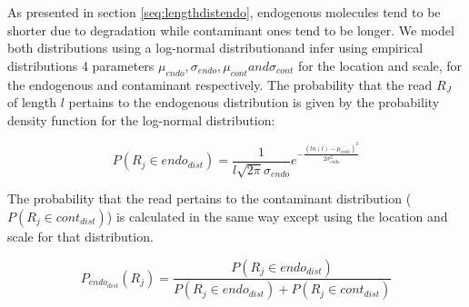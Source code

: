 \documentclass[a4paper,12pt]{article}
\begin{document}
%
%
%
%
%
%
%
%
%

As presented in section \ref{seq:lengthdistendo}, endogenous molecules tend to be shorter due to degradation while contaminant ones tend to be longer. We model both distributions using a log-normal distributionand infer using empirical distributions 4 parameters $\mu_{endo}, \sigma_{endo}, \mu_{cont} and \sigma_{cont}$ for the location and scale, for the endogenous and contaminant respectively. The probability that the read $R_J$ of length $l$ pertains to the endogenous distribution is given by the probability density function for the log-normal distribution:

\begin{equation}
P(R_j \in endo_{dist}) = \frac {1} {l \sqrt{2\pi} \sigma_{endo}} e^{ - \frac{(ln(l) - \mu_{endo})^2 }  {2 \sigma_{endo}^2} } 
\end{equation}

\noindent The probability that the read pertains to the contaminant distribution ($P(R_j \in cont_{dist})$) is calculated in the same way except using the location and scale for that distribution. 

\begin{equation}
P_{endo_{dist} }(R_j) = \frac {P(R_j \in endo_{dist})} {P(R_j \in endo_{dist}) + P(R_j \in cont_{dist})}
\end{equation}
\end{document}
